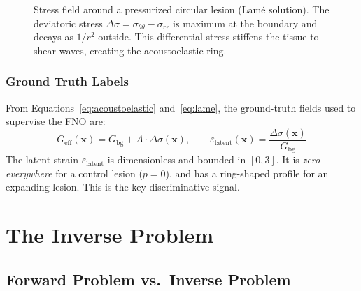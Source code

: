 \documentclass[11pt,letterpaper]{article}
\newcommand{\xvec}{\bm{x}}
\newcommand{\Geff}{G_{\mathrm{eff}}}
\newcommand{\Gbg}{G_{\mathrm{bg}}}
\newcommand{\eps}{\varepsilon_{\mathrm{latent}}}
\newcommand{\Dsig}{\Delta\sigma}
\begin{document}
\begin{figure}[H]
\centering
{}
\caption{Stress field around a pressurized circular lesion (Lam\'{e} solution). The
deviatoric stress $\Dsig = \sigma_{\theta\theta} - \sigma_{rr}$ is maximum at the
boundary and decays as $1/r^2$ outside. This differential stress stiffens the tissue to
shear waves, creating the acoustoelastic ring.}
\label{fig:lame_sketch}
\end{figure}

\subsubsection{Ground Truth Labels}

From Equations~\eqref{eq:acoustoelastic} and~\eqref{eq:lame}, the ground-truth
fields used to supervise the FNO are:
\[
    \Geff(\xvec) = \Gbg + A \cdot \Dsig(\xvec), \qquad
    \eps(\xvec) = \frac{\Dsig(\xvec)}{\Gbg}
\]
The latent strain $\eps$ is dimensionless and bounded in $[0, 3]$. It is
\emph{zero everywhere} for a control lesion ($p = 0$), and has a ring-shaped profile
for an expanding lesion. This is the key discriminative signal.

\section{The Inverse Problem}

\subsection{Forward Problem vs.\ Inverse Problem}
\end{document}
